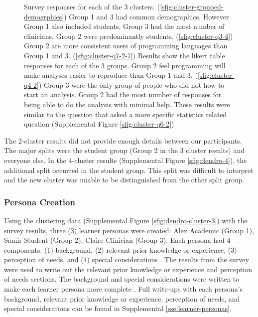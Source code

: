 \documentclass[020-persona\_validation.tex]{subfiles}
\begin{document}
\begin{figure}[!hbtp]
            {Survey responses for each of the 3 clusters.
                (\ref{sfig:cluster-grouped-demogrphics})
                Group 1 and 3 had common demographics, However Group 1 also included students.
                Group 3 had the most number of clinicians.
                Group 2 were predominantly students.
                (\ref{sfig:cluster-q3-4})
                Group 2 are more consistent users of programming languages than Group 1 and 3.
                (\ref{sfig:cluster-q7-2-7})
                Results show the likert table responses for each of the 3 groups.
                Group 2 feel programming will make analyses easier to reproduce than Group 1 and 3.
                (\ref{sfig:cluster-q4-2})
                Group 3 were the only group of people who did not how to start an analysis.
                Group 2 had the most number of responses for being able to do the analysis with minimal help.
                These results were similar to the question that asked a more specific statistics related question
                (Supplemental Figure \ref{sfig:cluster-q6-2})
            }
            \label{fig:cluster-results}
        \end{figure}

        The 2-cluster results did not provide enough details between our participants.
        The major splits were the student group (Group 2 in the 3 cluster results) and everyone else.
        In the 4-cluster results
        (Supplemental Figure \ref{sfig:dendro-4}),
        the additional split occurred in the student group.
        This split was difficult to interpret and the new cluster was unable to be distinguished from the other split group.

    \subsubsection{Persona Creation}

        Using the clustering data (Supplemental Figure \ref{sfig:dendro-cluster-3})
        with the survey results, three (3) learner personas were created:
        Alex Academic (Group 1), Samir Student (Group 2), Claire Clinician (Group 3).
        Each persona had 4 components: (1) background, (2) relevant prior knowledge or experience,
        (3) perception of needs, and (4) special considerations
        \cite{rstudioLearnerPersonas2019, softwarecarpentryLearnerProfiles, wilson2019teaching}.
        The results from the survey were used to write out the
        relevant prior knowledge or experience and perception of needs sections.
        The background and special considerations were written to make each learner persona more complete
        \cite{pruittPersonaLifecycleKeeping2006}.
        Full write-ups with each persona's
        background, relevant prior knowledge or experience, perception of needs, and special considerations
        can be found in Supplemental \ref{sse:learner-personas}.
\end{document}
